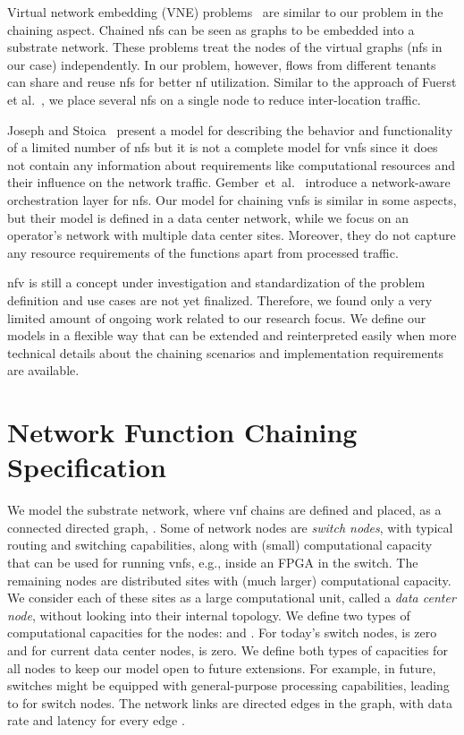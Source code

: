 \documentclass[10pt,a4paper,conference]{IEEEtran}
\begin{document}
Virtual network embedding (VNE) problems~\cite{Fischer2013} are similar to our problem 
in the chaining aspect. Chained \acp{nf} can be seen as graphs to be 
embedded into a substrate network. These problems treat the nodes of the virtual graphs 
(\acp{nf} in our case) independently. In our problem, however, flows from different 
tenants can share and reuse \acp{nf} for better \ac{nf} utilization.
Similar to the approach of Fuerst et al.~\cite{Fuerst2013}, we place several 
\acp{nf} on a single node to reduce inter-location traffic.

Joseph and Stoica~\cite{Joseph2008} present a model for describing the behavior 
and functionality of a limited number of \acp{nf} but it is not a complete model 
for \acp{vnf} since it does not contain any information about requirements like 
computational resources and their influence on the network traffic. 
Gember~et~al.~\cite{gember2013stratos} introduce a network-aware orchestration 
layer for \acp{nf}. Our model for chaining \acp{vnf} is similar in some
aspects, but their model is defined in a data center network, while we focus on an operator's network with multiple data center sites. 
Moreover, they do not capture any resource requirements of the functions 
apart from processed traffic. 

\ac{nfv} is still a concept under investigation and standardization of the problem 
definition and use cases are not yet finalized. Therefore, we found only a very 
limited amount of ongoing work related to our research focus. We define our models in 
a flexible way that can be extended and reinterpreted easily when more
technical details about the chaining scenarios and implementation requirements are
available.

\section{Network Function Chaining Specification}
\label{sec:specification}

We model the substrate network, where \ac{vnf} chains are defined and placed, 
as a connected directed graph, . 
Some of network nodes are \emph{switch nodes}, with typical routing and 
switching capabilities, along with (small) computational capacity that can be 
used for running \acp{vnf}, e.g., inside an FPGA in the switch. The remaining nodes 
are distributed sites with (much larger) computational capacity. We consider 
each of these sites as a large computational unit, called a 
\emph{data center node}, without looking into their internal topology. 
We define two types of computational capacities for the nodes: 
 and  . For today's switch nodes, 
is zero and for current data center nodes,  is zero. We define 
both types of capacities for all nodes to keep our model open to future extensions. 
For example, in future, switches might be equipped
with general-purpose processing capabilities, leading to  for switch nodes.
The network links are directed edges in the graph, with data rate 
 and latency  for every edge .
\end{document}
